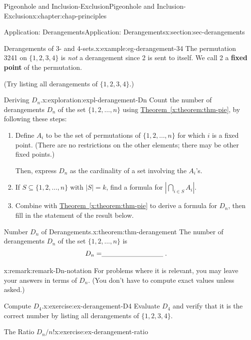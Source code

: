 \documentclass[oneside,10pt,]{book}
\newcommand{\xreffont}{\relax}
\newcommand{\terminology}[1]{\textbf{#1}}
\newcommand{\fillin}[1]{\leavevmode\leaders\vrule height -1.2pt depth 1.5pt \hskip #1em minus #1em \null}
\numberwithin{equation}{section}
\begin{document}
\begin{chapterptx}{Pigeonhole and Inclusion-Exclusion}{}{Pigeonhole and Inclusion-Exclusion}{}{}{x:chapter:chap-principles}
\begin{sectionptx}{Application: Derangements}{}{Application: Derangements}{}{}{x:section:sec-derangements}
\begin{example}{Derangements of 3- and 4-sets.}{x:example:eg-derangement-34}
The permutation 3241 on \(\{1,2,3,4\}\) is \emph{not} a derangement since 2 is sent to itself. We call 2 a \terminology{fixed point} of the permutation.%
\par
(Try listing all derangements of \(\{1,2,3,4\}\).)%
\end{example}
\begin{exploration}{Deriving \(D_n\).}{x:exploration:expl-derangement-Dn}%
Count the number of derangements \(D_n\) of the set \(\{1,2,\ldots,n\}\) using \hyperref[x:theorem:thm-pie]{Theorem~{\xreffont\ref{x:theorem:thm-pie}}}, by following these steps: \label{g:notation:id531587}%
\begin{enumerate}[font=\bfseries,label=(\alph*),ref=\alph*]
\item{}Define \(A_i\) to be the set of permutations of \(\{1,2,\ldots,n\}\) for which \(i\) is a fixed point. (There are no restrictions on the other elements; there may be other fixed points.)%
\par
Then, express \(D_n\) as the cardinality of a set involving the \(A_i\)'s.%
\item{}If \(S \subseteq \{1,2,\ldots,n\}\) with \(|S| = k\), find a formula for \(\left|\displaystyle\bigcap_{i \in S} A_i\right|\).%
\item{}Combine with \hyperref[x:theorem:thm-pie]{Theorem~{\xreffont\ref{x:theorem:thm-pie}}} to derive a formula for \(D_n\), then fill in the statement of the result below.%
\end{enumerate}
\end{exploration}%
\begin{theorem}{Number \(D_n\) of Derangements.}{}{x:theorem:thm-derangement}%
The number of derangements \(D_n\) of the set \(\{1,2,\ldots,n\}\) is%
\begin{equation*}
D_n = \fillin{9.090909090909092}\text{.}
\end{equation*}
%
\end{theorem}
\begin{remark}{}{x:remark:remark-Dn-notation}%
For problems where it is relevant, you may leave your answers in terms of \(D_n\). (You don't have to compute exact values unless asked.)%
\end{remark}
\begin{inlineexercise}{Compute \(D_4\).}{x:exercise:ex-derangement-D4}%
Evaluate \(D_4\) and verify that it is the correct number by listing all derangements of \(\{1,2,3,4\}\).%
\end{inlineexercise}%
\begin{inlineexercise}{The Ratio \(D_n/n!\)}{x:exercise:ex-derangement-ratio}%

\end{inlineexercise}
\end{sectionptx}
\end{chapterptx}
\end{document}
